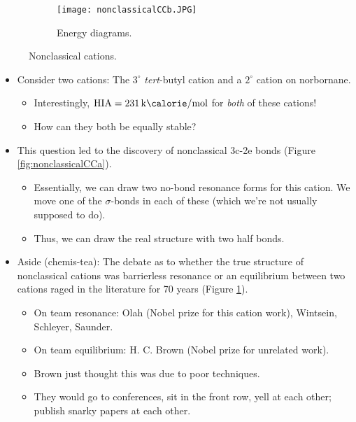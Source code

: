 \documentclass[../notes.tex]{subfiles}
\begin{document}
\begin{itemize}
\begin{figure}[h!]
\begin{subfigure}[b]{0.49\linewidth}
        \end{subfigure}
        \begin{subfigure}[b]{0.3\linewidth}
            \centering
            \texttt{[image: nonclassicalCCb.JPG]}
            \caption{Energy diagrams.}
            \label{fig:nonclassicalCCb}
        \end{subfigure}
        \caption{Nonclassical cations.}
        \label{fig:nonclassicalCC}
    \end{figure}
    \begin{itemize}
        \item Consider two cations: The $3^\circ$ \emph{tert}-butyl cation and a $2^\circ$ cation on norbornane.
        \begin{itemize}
            \item Interestingly, $\text{HIA}=\kcal{231}$ for \emph{both} of these cations!
            \item How can they both be equally stable?
        \end{itemize}
        \item This question led to the discovery of nonclassical 3c-2e bonds (Figure \ref{fig:nonclassicalCCa}).
        \begin{itemize}
            \item Essentially, we can draw two no-bond resonance forms for this cation. We move one of the $\sigma$-bonds in each of these (which we're not usually supposed to do).
            \item Thus, we can draw the real structure with two half bonds.
        \end{itemize}
        \pagebreak
        \item Aside (chemis-tea): The debate as to whether the true structure of nonclassical cations was barrierless resonance or an equilibrium between two cations raged in the literature for 70 years (Figure \ref{fig:nonclassicalCCb}).
        \begin{itemize}
            \item On team resonance: Olah (Nobel prize for this cation work), Wintsein, Schleyer, Saunder.
            \item On team equilibrium: H. C. Brown (Nobel prize for unrelated work).
            \item Brown just thought this was due to poor techniques.
            \item They would go to conferences, sit in the front row, yell at each other; publish snarky papers at each other.

\end{itemize}
\end{itemize}
\end{itemize}
\end{document}
